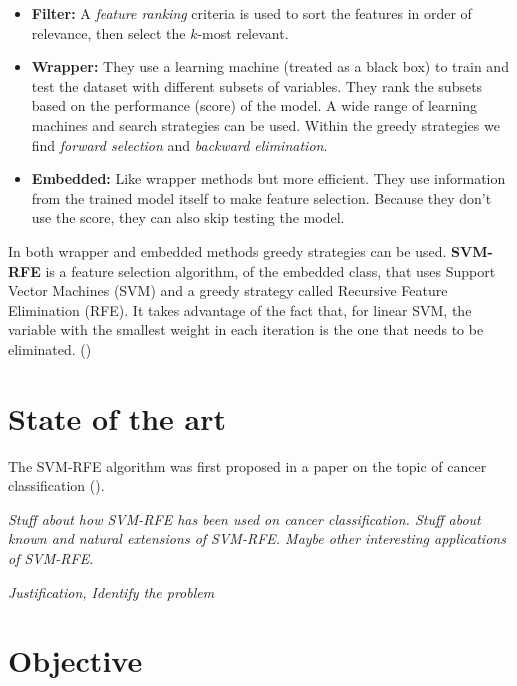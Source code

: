 \begin{itemize}
    \item \textbf{Filter:} A \emph{feature ranking} criteria is used to sort the features in order of relevance, then select the $k$-most relevant.
    \item \textbf{Wrapper:} They use a learning machine (treated as a black box) to train and test the dataset with different subsets of variables. They rank the subsets based on the performance (score) of the model. A wide range of learning machines and search strategies can be used. Within the greedy strategies we find \emph{forward selection} and \emph{backward elimination}.
    \item \textbf{Embedded:} Like wrapper methods but more efficient. They use information from the trained model itself to make feature selection. Because they don't use the score, they can also skip testing the model.
\end{itemize}

In both wrapper and embedded methods greedy strategies can be used. \textbf{SVM-RFE} is a feature selection algorithm, of the embedded class, that uses Support Vector Machines (SVM) and a greedy strategy called Recursive Feature Elimination (RFE). It takes advantage of the fact that, for linear SVM, the variable with the smallest weight in each iteration is the one that needs to be eliminated. (\cite{guyon_introduction_2003})


\section{State of the art}

The SVM-RFE algorithm was first proposed in a paper on the topic of cancer class\-ification (\cite{guyon_gene_2002}).

\emph{Stuff about how SVM-RFE has been used on cancer classification. Stuff about known and natural extensions of SVM-RFE. Maybe other interesting applications of SVM-RFE}.

\emph{Justification, Identify the problem}


\section{Objective}

